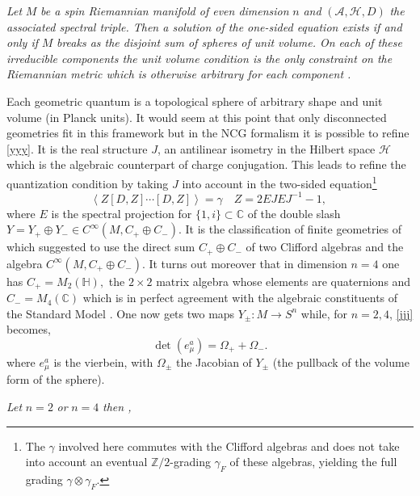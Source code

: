 \documentclass
[twocolumn,prl,unsortedaddress,superscriptaddress,showpacs]{revtex4}%
\begin{document}
\emph{Let }$M$\emph{ be a spin Riemannian manifold of even dimension }%
$n$\emph{ and }$(\mathcal{A},\mathcal{H},D)$\emph{ the associated spectral
triple. Then a solution of the one-sided equation exists if and only if }%
$M$\emph{ breaks as the disjoint sum of spheres of unit volume. On each of
these irreducible components the unit volume condition is the only constraint
on the Riemannian metric which is otherwise arbitrary for each component
\cite{CCM1}. }

Each geometric quantum is a topological sphere of arbitrary shape and unit
volume (in Planck units). It would seem at this point that only disconnected
geometries fit in this framework but in the NCG formalism it is possible to
refine \eqref{yyy}. It is the real structure $J$, an antilinear isometry in
the Hilbert space $\mathcal{H}$ which is the algebraic counterpart of charge
conjugation. This leads to refine the quantization condition by taking $J$
into account in the two-sided equation\footnote{The $\gamma$ involved here
commutes with the Clifford algebras and does not take into account an eventual
$\mathbb{Z}/2$-grading $\gamma_{F}$ of these algebras, yielding the full
grading $\gamma\otimes\gamma_{F}$.}
\begin{equation}
\left\langle Z\left[  D,Z\right]  \cdots\left[  D,Z\right]  \right\rangle
=\gamma\quad Z=2EJEJ^{-1}-1,\ \label{jjj}%
\end{equation}
where $E$ is the spectral projection for $\{1,i\}\subset\mathbb{C}$ of the
double slash $Y=Y_{+}\oplus Y_{-}\in C^{\infty}(M,C_{+}\oplus C_{-})$. It is
the classification of finite geometries of \cite{CC2} which suggested to use
the direct sum $C_{+}\oplus C_{-}$ of two Clifford algebras and the algebra
$C^{\infty}(M,C_{+}\oplus C_{-})$. It turns out moreover that in dimension
$n=4$ one has $C_{+}=M_{2}(\mathbb{H}),$ the $2\times2$ matrix algebra whose
elements are quaternions and $C_{-}=M_{4}(\mathbb{C})$ which is in perfect
agreement with the algebraic constituents of the Standard Model \cite{CC2}.
One now gets two maps $Y_{\pm}:M\rightarrow S^{n}$ while, for $n=2,4$,
\eqref{jjj} becomes,
\begin{equation}
\det\left(  e_{\mu}^{a}\right)  =\Omega_{+}+\Omega_{-}. \label{qqq}%
\end{equation}
where $e_{\mu}^{a}$ is the vierbein, with $\Omega_{\pm}$ the Jacobian of
$Y_{\pm}$ (the pullback of the volume form of the sphere).

\emph{ Let }$n=2$\emph{ or }$n=4$\emph{ then \cite{CCM1}, }
\end{document}
